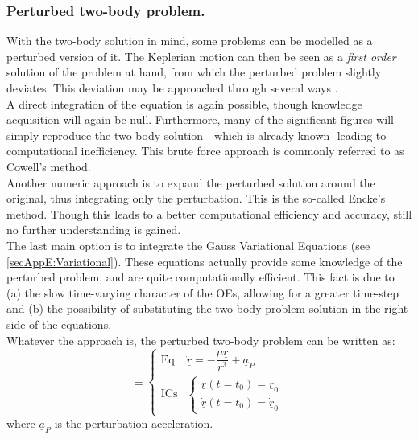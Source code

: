 			\subsubsection{Perturbed two-body problem.}
			\indent With the two-body solution in mind, some problems can be modelled as a perturbed version of it. The Keplerian motion can then be seen as a \textit{first order} solution of the problem at hand, from which the perturbed problem slightly deviates. This deviation may be approached through several ways \cite{Wiesel}. \\
			\indent A direct integration of the equation is again possible, though knowledge acquisition will again be null. Furthermore, many of the significant figures will simply reproduce the two-body solution - which is already known- leading to computational inefficiency. This brute force approach is commonly referred to as Cowell's method. \\
			\indent Another numeric approach is to expand the perturbed solution around the original, thus integrating only the perturbation. This is the so-called Encke's method. Though this leads to a better computational efficiency and accuracy, still no further understanding is gained. \\
			\indent The last main option is to integrate the Gauss Variational Equations (see \ref{secAppE:Variational}). These equations actually provide some knowledge of the perturbed problem, and are quite computationally efficient. This fact is due to (a) the slow time-varying character of the OEs, allowing for a greater time-step and (b) the possibility of substituting the two-body problem solution in the right-side of the equations. \\
			\indent Whatever the approach is, the perturbed two-body problem can be written as:
			\begin{equation}
			[P]\equiv\left\{ \begin{array}{lcc}
			\text{Eq.} &  \ddot{\underline{r}} = -\dfrac{\mu \underline{r}}{r^3} + \underline{a}_P\\[1em]
			\text{ICs} & \left\{ \begin{array}{ll}
			\underline{r} (t = t_0) = \underline{r}_{0} \\
			\dot{\underline{r}} (t = t_0) = \dot{\underline{r}}_{0} 
			\end{array}\right.
			\end{array}\right.
			\label{eqCh2:2BP_pert}
			\end{equation}
			\noindent where $\underline{a}_P$ is the perturbation acceleration.
